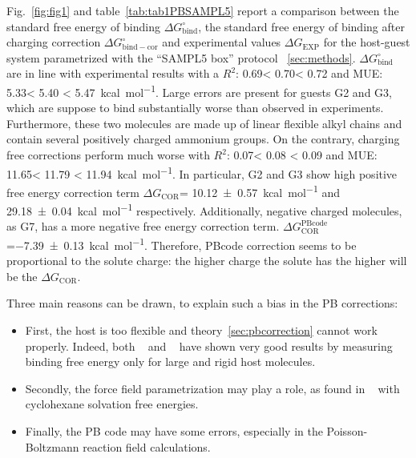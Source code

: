 \documentclass[11pt,oneside,a4paper]{article}
\begin{document}
Fig.~\ref{fig:fig1} and table~\ref{tab:tab1PBSAMPL5} report a comparison between the standard free energy of binding $\Delta G_\mathrm{bind}^\circ$, the standard free energy of binding after charging correction $\Delta G_\mathrm{bind-cor}^\circ$ and experimental values $\Delta G_\mathrm{EXP}$ for the host-guest system parametrized with the ``SAMPL5 box'' protocol ~\ref{sec:methods}.
$\Delta G_\mathrm{bind}^\circ$ are in line with experimental results with a $R^2$: 0.69< 0.70< 0.72 and MUE: 5.33< 5.40 < 5.47\SI{}{kcal mol^{-1}}. Large errors are present for guests G2 and G3, which are suppose to bind substantially worse than observed in experiments. Furthermore, these two molecules are made up of linear flexible alkyl chains and contain several positively charged ammonium groups.%
On the contrary, charging free corrections perform much worse with $R^2$: 0.07< 0.08 < 0.09 and MUE: 11.65< 11.79 < 11.94\SI{}{kcal mol^{-1}}. In particular, G2 and G3 show high positive free energy correction term $\Delta G_\mathrm{COR}$= \SI{10.12 +- 0.57}{kcal mol^{-1}} and \SI{29.18 +- 0.04}{kcal mol^{-1}} respectively. Additionally, negative charged molecules, as G7, has a more negative free energy correction term.
$\Delta G^\mathrm{PBcode}_\mathrm{COR}$=\SI{-7.39 +- 0.13}{kcal mol^{-1}}. Therefore, PBcode correction seems to be proportional to the solute charge: the higher charge the solute has the higher will be the $\Delta G_\mathrm{COR}$. 

Three main reasons can be drawn, to explain such a bias in the PB corrections:
\begin{itemize}
 \item First, the host is too flexible and theory~\ref{sec:pbcorrection} cannot work properly. Indeed, both ~\cite{Reif2014} and ~\cite{Rocklin} have shown very good results by measuring binding free energy only for large and rigid host molecules.
 \item Secondly, the force field parametrization may play a role, as found in ~\cite{LogD} with cyclohexane solvation free energies.
 \item Finally, the PB code may have some errors, especially in the Poisson-Boltzmann reaction field calculations.
\end{itemize}
\end{document}
